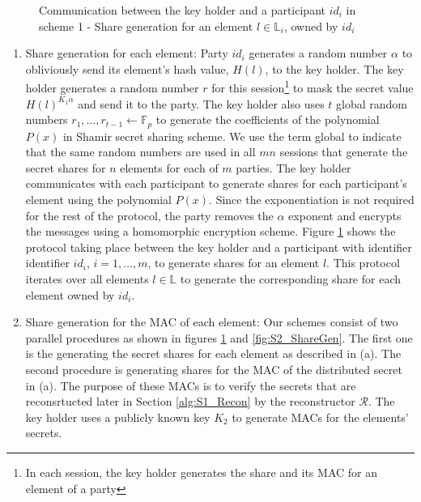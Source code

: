 \begin{figure}[h!]
   \caption{Communication between the key holder and a participant $id_i$ in scheme 1 - Share generation for an element $l \in \mathbb{L}_i$, owned by $id_i$}
   \label{fig:S1_ShareGen}
\end{figure}
\begin{enumerate}[label=(\alph*)]
    \item Share generation for each element: Party $id_i$ generates a random number $\alpha$ to obliviously send its element's hash value, $H(l)$, to the key holder. The key holder generates a random number $r$ for this session\footnote{In each session, the key holder generates the share and its MAC for an element of a party} to mask the secret value $H(l)^{K_1 \alpha}$ and send it to the party. The key holder also uses $t$ global random numbers $r_1, \dots, r_{t-1} \gets \mathbb{F}_p$ to generate the coefficients of the polynomial $P(x)$ in Shamir secret sharing scheme. We use the term global to indicate that the same random numbers are used in all $mn$ sessions that generate the secret shares for $n$ elements for each of $m$ parties. The key holder communicates with each participant to generate shares for each participant's element using the polynomial $P(x)$. Since the exponentiation is not required for the rest of the protocol, the party removes the $\alpha$ exponent and encrypts the messages using a homomorphic encryption scheme. Figure \ref{fig:S1_ShareGen} shows the protocol taking place between the key holder and a participant with identifier identifier $id_i$, $i =1, \dots, m$, to generate shares for an element $l$. This protocol iterates over all elements $l \in \mathbb{L}$ to generate the corresponding share for each element owned by $id_i$.
    \item Share generation for the MAC of each element: Our schemes consist of two parallel procedures as shown in figures \ref{fig:S1_ShareGen} and \ref{fig:S2_ShareGen}. The first one is the generating the secret shares for each element as described in (a). The second procedure is generating shares for the MAC of the distributed secret in (a). The purpose of these MACs is to verify the secrets that are reconsrtucted later in Section \ref{alg:S1_Recon} by the reconstructor $\mathcal{R}$. The key holder uses a publicly known key $K_2$ to generate MACs for the elements' secrets. 
\end{enumerate}


